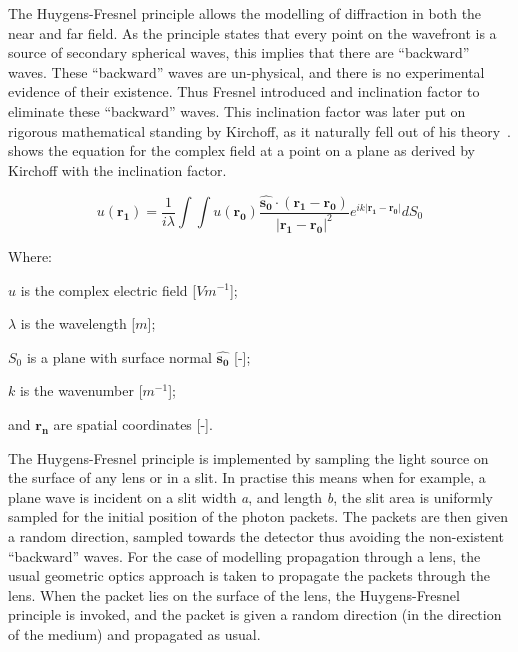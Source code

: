 The Huygens-Fresnel principle allows the modelling of diffraction in both the near and far field.
As the principle states that every point on the wavefront is a source of secondary spherical waves, this implies that there are ``backward'' waves.
These ``backward'' waves are un-physical, and there is no experimental evidence of their existence.
Thus Fresnel introduced and inclination factor to eliminate these ``backward'' waves.
This inclination factor was later put on rigorous mathematical standing by Kirchoff, as it naturally fell out of his theory~\cite{kirchhoff1883ann,born2000principles}.
 shows the equation for the complex field at a point on a plane as derived by Kirchoff with the inclination factor.

\begin{equation}
u(\mathbf{r_1})=\frac{1}{i\lambda}\int\int u(\mathbf{r_0})\frac{\mathbf{\hat{s_0}} \cdot (\mathbf{r_1} - \mathbf{r_0})}{\left|\mathbf{r_1} - \mathbf{r_0}\right|^2}e^{ik\left|\mathbf{r_1} - \mathbf{r_0}\right|}dS_0
\label{eqn:kirchhoffeqn}
\end{equation}

\noindent Where:

    \indent $u$ is the complex electric field [$Vm^{-1}$];

    \indent $\lambda$ is the wavelength [$m$];

    \indent $S_0$ is a plane with surface normal $\mathbf{\hat{s_0}}$ [-];

    \indent $k$ is the wavenumber [$m^{-1}$];

    \indent and $\mathbf{r_n}$ are spatial coordinates [-]. 

\medskip

The Huygens-Fresnel principle is implemented by sampling the light source on the surface of any lens or in a slit.
In practise this means when for example, a plane wave is incident on a slit width \textit{a}, and length \textit{b}, the slit area is uniformly sampled for the initial position of the photon packets.
The packets are then given a random direction, sampled towards the detector thus avoiding the non-existent ``backward'' waves.
For the case of modelling propagation through a lens, the usual geometric optics approach is taken to propagate the packets through the lens.
When the packet lies on the surface of the lens, the Huygens-Fresnel principle is invoked, and the packet is given a random direction (in the direction of the medium) and propagated as usual.

\medskip

